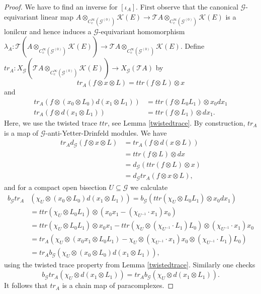 \documentclass[10pt,a4paper]{amsart}
\newcommand{\G}{\mathcal{G}}
\newcommand{\K}{\mathcal{K}}
\newcommand{\T}{\mathcal{T}}
\newcommand{\ccinfty}{C_c^\infty}
\begin{document}
\begin{proof}
We have to find an inverse for $ [\iota_A] $. First observe that the canonical $ \G $-equivariant linear map $ A \otimes_{\ccinfty(\G^{(0)})} \K(E) \rightarrow 
\T A \otimes_{\ccinfty(\G^{(0)})} \K(E) $ is a lonilcur and hence induces 
a $ \G $-equivariant homomorphism $ \lambda_A: \T(A \otimes_{\ccinfty(\G^{(0)})}
\K(E)) \rightarrow \T A \otimes_{\ccinfty(\G^{(0)})} \K(E) $.
Define $ tr_A: X_\G(\T A \otimes_{\ccinfty(\G^{(0)})} \K(E))
\rightarrow X_\G(\T A) $ by
\begin{equation*}
tr_A(f \otimes x \otimes L) = ttr(f \otimes L) \otimes x
\end{equation*}
and
\begin{align*}
tr_A(f \otimes (x_0 \otimes L_0) d(x_1 \otimes L_1)) &= 
ttr(f \otimes L_0 L_1) \otimes x_0 dx_1 \\
tr_A(f \otimes d(x_1 \otimes L_1)) &= 
ttr(f \otimes L_1) \otimes dx_1.
\end{align*}
Here, we use the twisted trace $ ttr $, see Lemma \ref{twistedtrace}. By construction, $ tr_A $ is a map of $ \G $-anti-Yetter-Drinfeld modules. 
We have
\begin{align*}
tr_A d_\G(f \otimes x \otimes L) &= tr_A(f \otimes d(x \otimes L)) \\
&= ttr(f \otimes L) \otimes dx \\
&= d_\G(ttr(f \otimes L) \otimes x) \\
&= d_\G tr_A(f \otimes x \otimes L), 
\end{align*}
and for a compact open bisection $ U \subseteq \G $ we calculate 
\begin{align*}
b_\G tr_A&(\chi_U \otimes (x_0 \otimes L_0) d(x_1\otimes L_1)) = b_\G(ttr(\chi_U \otimes L_0 L_1) \otimes x_0dx_1) \\
&= ttr(\chi_U \otimes L_0 L_1) \otimes (x_0x_1 - (\chi_{U^{-1}}\cdot x_1)x_0) \\
&= ttr(\chi_U \otimes L_0 L_1) \otimes x_0x_1 
- ttr(\chi_U \otimes (\chi_{U^{-1}}\cdot L_1) L_0) \otimes (\chi_{U^{-1}}\cdot x_1)x_0 \\ 
&= tr_A(\chi_U \otimes (x_0x_1\otimes L_0 L_1) - \chi_U \otimes (\chi_{U^{-1}} \cdot x_1)x_0 \otimes (\chi_{U^{-1}}\cdot L_1)L_0) \\
&= tr_A b_\G(\chi_U \otimes (x_0\otimes L_0) d(x_1\otimes L_1)), 
\end{align*}
using the twisted trace property from Lemma \ref{twistedtrace}. Similarly one checks
$$
b_\G tr_A(\chi_U \otimes d(x_1\otimes L_1)) = tr_A b_\G(\chi_U \otimes d(x_1\otimes L_1)). 
$$
It follows that $ tr_A $ is a chain map of paracomplexes. 


\end{proof}
\end{document}
